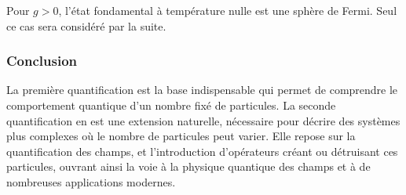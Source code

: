 Pour $g > 0$, l'état fondamental à température nulle est une sphère de Fermi. Seul ce cas sera considéré par la suite.


\subsubsection*{Conclusion}

La première quantification est la base indispensable qui permet de comprendre le comportement quantique d’un nombre fixé de particules. La seconde quantification en est une extension naturelle, nécessaire pour décrire des systèmes plus complexes où le nombre de particules peut varier. Elle repose sur la quantification des champs, et l’introduction d’opérateurs créant ou détruisant ces particules, ouvrant ainsi la voie à la physique quantique des champs et à de nombreuses applications modernes.

